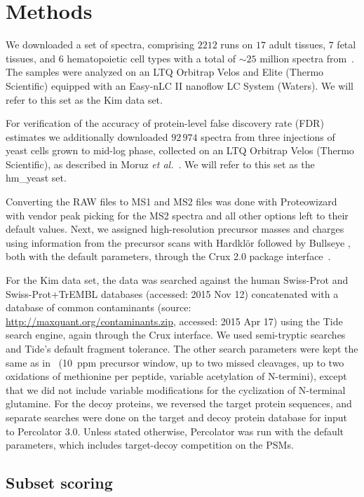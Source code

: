 \documentclass{article}
\begin{document}
\section*{Methods}

We downloaded a set of spectra, comprising $2212$ runs on $17$ adult
tissues, $7$ fetal tissues, and $6$ hematopoietic cell types with a
total of $\sim 25$ million spectra from~\cite{kim2014draft}. The
samples were analyzed on an LTQ Orbitrap Velos and Elite (Thermo
Scientific) equipped with an Easy-nLC II nanoflow LC System
(Waters). We will refer to this set as the Kim data set.

For verification of the accuracy of protein-level false discovery rate 
(FDR) estimates we additionally downloaded $92\,974$ spectra from 
three injections of yeast cells grown to mid-log phase, collected on 
an LTQ Orbitrap Velos (Thermo Scientific), as described in Moruz {\em 
et al.}~\cite{moruz2013}.  We will refer to this set as the hm\_yeast 
set.

Converting the RAW files to MS1 and MS2 files was done with
Proteowizard~\cite{kessner2008} with vendor peak picking for the MS2
spectra and all other options left to their default values.  Next, we
assigned high-resolution precursor masses and charges using
information from the precursor scans with Hardkl\"{o}r
\cite{hoopmann2007} followed by Bullseye \cite{hsieh2009}, both with
the default parameters, through the Crux 2.0 package
interface~\cite{mcilwain2014}.

For the Kim data set, the data was searched against the human
Swiss-Prot and Swiss-Prot+TrEMBL databases (accessed: 2015 Nov 12)
concatenated with a database of common contaminants (source:
\url{http://maxquant.org/contaminants.zip}, accessed: 2015 Apr 17)
using the Tide search engine, again through the Crux interface. We
used semi-tryptic searches and Tide's default fragment tolerance. The
other search parameters were kept the same as in~\cite{kim2014draft}
(10~ppm precursor window, up to two missed cleavages, up to two
oxidations of methionine per peptide, variable acetylation of
N-termini), except that we did not include variable modifications for
the cyclization of N-terminal glutamine.  For the decoy proteins, we
reversed the target protein sequences, and separate searches were done
on the target and decoy protein database for input to Percolator
3.0. Unless stated otherwise, Percolator was run with the default
parameters, which includes target-decoy competition on the PSMs.

\subsection*{Subset scoring}
\end{document}
